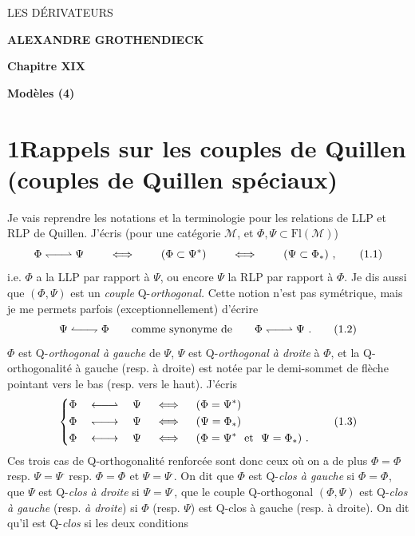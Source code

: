 \documentclass[11pt]{article}
\newcommand{\printedpage}[1]{\marginpar{\footnotesize p.~#1}}
\newcommand{\msp}[1]{\marginpar{\footnotesize [#1]}}
\newcommand{\Qo}{\mathrel{\leftharpoondown\joinrel\relbar\joinrel\rightharpoonup}}   %
\newcommand{\Qorev}{\mathrel{\leftharpoonup\joinrel\relbar\joinrel\rightharpoondown}} %
\newcommand{\Qog}{\mathrel{\leftarrow\joinrel\relbar\joinrel\rightharpoonup}}         %
\newcommand{\Qod}{\mathrel{\leftharpoondown\joinrel\relbar\joinrel\rightarrow}}       %
\newcommand{\Qogd}{\mathrel{\leftarrow\joinrel\relbar\joinrel\rightarrow}}            %
\newcommand{\tld}{\tilde{}}   %
\newcommand{\rcl}{\bar{}}       %
\begin{document}
\printedpage{(non numérotée)}

\begin{center}
{\Large\textsf{LES DÉRIVATEURS}}

\bigskip

\textbf{ALEXANDRE GROTHENDIECK}

\bigskip\bigskip

\textbf{Chapitre XIX}

\medskip

\textbf{Modèles (4)}
\end{center}

\newpage


\printedpage{1}

\msp{page 1}

\section*{1\quad Rappels sur les couples de Quillen (couples de Quillen spéciaux)}

Je vais reprendre les notations et la terminologie pour les relations de LLP et RLP de Quillen. J'écris (pour une catégorie $\mathcal{M}$, et $\Phi, \Psi \subset \mathrm{Fl}(\mathcal{M})$)
\[
\Phi \Qo \Psi \qquad \iff \qquad (\Phi \subset \Psi^{*}) \qquad \iff \qquad (\Psi \subset \Phi_{*})\ ,
\tag*{(1.1)}
\]
i.e. $\Phi$ a la LLP par rapport à $\Psi$, ou encore $\Psi$ la RLP par rapport à $\Phi$. Je dis aussi que $(\Phi, \Psi)$ est un \textit{couple} Q-\textit{orthogonal.} Cette notion n'est pas symétrique, mais je me permets parfois (exceptionnellement) d'écrire
\[
\Psi \Qorev \Phi \qquad \text{comme synonyme de} \qquad \Phi \Qo \Psi\ .
\tag*{(1.2)}
\]
$\Phi$ est Q-\textit{orthogonal à gauche} de $\Psi$, $\Psi$ est Q-\textit{orthogonal à droite} à $\Phi$, et la Q-orthogonalité à gauche (resp. à droite) est notée par le demi-sommet de flèche pointant vers le bas (resp. vers le haut). J'écris
\[
\left\{
\begin{aligned}
&\Phi \quad \Qog \quad \Psi \quad \iff \quad (\Phi = \Psi^{*})\\
&\Phi \quad \Qod \quad \Psi \quad \iff \quad (\Psi = \Phi_{*})\\
&\Phi \quad \Qogd \quad \Psi \quad \iff \quad (\Phi = \Psi^{*} \ \text{ et } \ \Psi = \Phi_{*})\ .
\end{aligned}
\right.
\tag*{(1.3)}
\]
Ces trois cas de Q-orthogonalité renforcée sont donc ceux où on a de plus $\Phi = \Phi^{\tld}$
resp. $\Psi = \Psi^{\rcl}$ resp. $\Phi = \Phi^{\tld}$ et $\Psi = \Psi^{\rcl}$. On dit que $\Phi$ est Q-\textit{clos à gauche} si $\Phi = \Phi^{\tld}$, que %
$\Psi$ est Q-\textit{clos à droite} si $\Psi = \Psi^{\rcl}$, que le couple Q-orthogonal $(\Phi, \Psi)$ est Q-\textit{clos à gauche} (resp. \textit{à droite}) si $\Phi$ (resp. $\Psi$) est Q-clos à gauche (resp. à droite). On dit qu'il est Q-\textit{clos} si les deux conditions %
\end{document}
